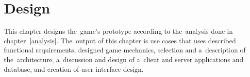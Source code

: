 \chapter{Design}
\label{chapter:design}

This chapter designs the~game's prototype according to the~analysis done in chapter~\ref{analysis}.
The~output of this chapter is use cases that uses described functional requirements, designed game mechanics, selection and a~description of the~architecture, a~discussion and design of a~client and server applications and database, and creation of user interface design.


\pagebreak






